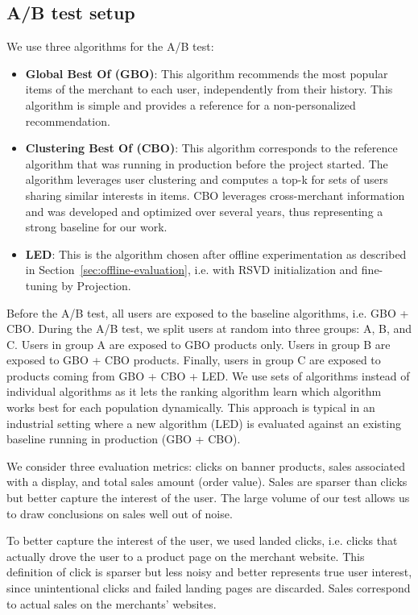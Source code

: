 \documentclass[sigconf]{acmart}
\begin{document}
\subsection{A/B test setup}
\label{sec:ab-test-setup}
We use three algorithms for the A/B test:
\begin{itemize}
    \item \textbf{Global Best Of (GBO)}: This algorithm recommends the most popular items of the merchant to each user, independently from their history. This algorithm is simple and provides a reference for a non-personalized recommendation.
    
    \item \textbf{Clustering Best Of (CBO)}: This algorithm corresponds to the reference algorithm that was running in production before the project started. The algorithm leverages user clustering and computes a top-k for sets of users sharing similar interests in items. CBO leverages cross-merchant information and was developed and optimized over several years, thus representing a strong baseline for our work.
    
    \item \textbf{LED}: This is the algorithm chosen after offline experimentation as described in Section~\ref{sec:offline-evaluation}, i.e. with RSVD initialization and fine-tuning by Projection.
\end{itemize}

Before the A/B test, all users are exposed to the baseline algorithms, i.e. GBO + CBO. During the A/B test, we split users at random into three groups: A, B, and C. Users in group A are exposed to GBO products only. Users in group B are  exposed to GBO + CBO products. Finally, users in group C are exposed to products coming from GBO + CBO + LED. We use sets of algorithms instead of individual algorithms as it lets the ranking algorithm learn which algorithm works best for each population dynamically. This approach is typical in an industrial setting where a new algorithm (LED) is evaluated against an existing baseline running in production (GBO + CBO).

We consider three evaluation metrics: clicks on banner products, sales associated with a display, and total sales amount (order value). Sales are sparser than clicks but better capture the interest of the user. The large volume of our test allows us to draw conclusions on sales well out of noise.

To better capture the interest of the user, we used landed clicks, i.e. clicks that actually drove the user to a product page on the merchant website. This definition of click is sparser but less noisy and better represents true user interest, since unintentional clicks and failed landing pages are discarded. Sales correspond to actual sales on the merchants' websites.
\end{document}
